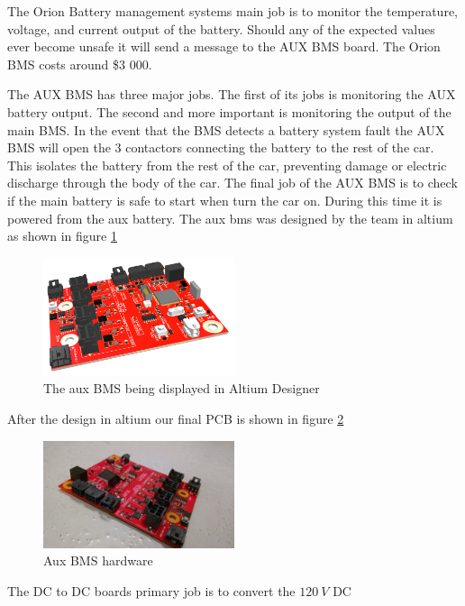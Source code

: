 \documentclass[titlepage]{article}
\begin{document}
    The Orion Battery management systems main job is to monitor the
    temperature, voltage, and current output of the battery. Should any
    of the expected values ever become unsafe it will send a message to
    the AUX BMS board. The Orion BMS costs around \$3 000.
    \par The AUX BMS has three major jobs. The first of its jobs is
    monitoring the AUX battery output. The second and more important is
    monitoring the output of the main BMS. In the event that the BMS
    detects a battery system fault the AUX BMS will open the 3
    contactors connecting the battery to the rest of the car. This
    isolates the battery from the rest of the car, preventing damage or
    electric discharge through the body of the car. The final job of the
    AUX BMS is to check if the main battery is safe to start when turn
    the car on. During this time it is powered from the aux battery. The
    aux bms was designed by the team in altium as shown in figure
    \ref{fig:aux-bms-alt}
    \begin{figure}[H]
        \centering
        \includegraphics[width=0.5\textwidth]{images/aux_bms_alt.png}
        \caption{The aux BMS being displayed in Altium Designer}
        \label{fig:aux-bms-alt}
    \end{figure}
    \noindent After the design in altium our final PCB is shown in
    figure \ref{fig:aux-bms}
    \begin{figure}[H]
        \centering
        \includegraphics[width=0.5\textwidth]{images/aux_bms.jpeg}
        \caption{Aux BMS hardware}
        \label{fig:aux-bms}
    \end{figure}
    \par The DC to DC boards primary job is to convert the $120\ V$ DC
\end{document}

